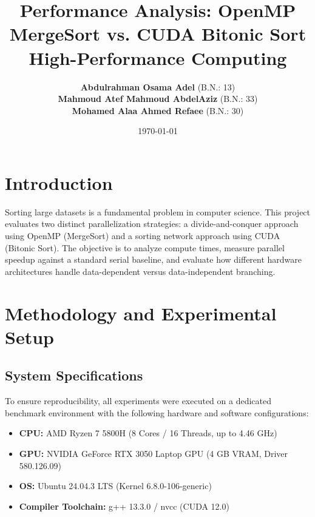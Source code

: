 \documentclass[12pt, a4paper]{article}
\begin{document}
\title{\textbf{Performance Analysis: OpenMP MergeSort vs. CUDA Bitonic Sort}\\
\vspace{0.5em}
\Large  High-Performance Computing}

\author{
    \textbf{Abdulrahman Osama Adel} (B.N.: 13) \\
    \textbf{Mahmoud Atef Mahmoud AbdelAziz} (B.N.: 33) \\
    \textbf{Mohamed Alaa Ahmed Refaee} (B.N.: 30)
}
\date{\today}

\maketitle


\vspace{1em}

\section{Introduction}
Sorting large datasets is a fundamental problem in computer science. This project evaluates two distinct parallelization strategies: a divide-and-conquer approach using OpenMP (MergeSort) and a sorting network approach using CUDA (Bitonic Sort). The objective is to analyze compute times, measure parallel speedup against a standard serial baseline, and evaluate how different hardware architectures handle data-dependent versus data-independent branching.

\section{Methodology and Experimental Setup}

\subsection{System Specifications}
To ensure reproducibility, all experiments were executed on a dedicated benchmark environment with the following hardware and software configurations:
\begin{itemize}
    \item \textbf{CPU:} AMD Ryzen 7 5800H (8 Cores / 16 Threads, up to 4.46 GHz)
    \item \textbf{GPU:} NVIDIA GeForce RTX 3050 Laptop GPU (4 GB VRAM, Driver 580.126.09)
    \item \textbf{OS:} Ubuntu 24.04.3 LTS (Kernel 6.8.0-106-generic)
    \item \textbf{Compiler Toolchain:} g++ 13.3.0 / nvcc (CUDA 12.0)
\end{itemize}
\end{document}
